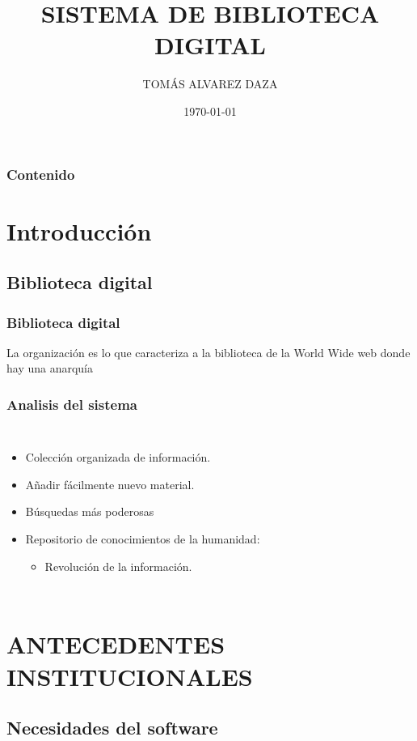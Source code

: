 \documentclass[article]{beamer}
\title{SISTEMA DE BIBLIOTECA DIGITAL}
\author{TOMÁS ALVAREZ DAZA}
\institute{PLANIFICACIÓN DEL DESARROLLO DE SOFTWARE \\ Universidad Bolivana de Informática}
\date{\scriptsize{\today}}
\begin{document}

\maketitle


\begin{frame}
\frametitle{Contenido}
\tableofcontents
\end{frame}
\section{Introducción}
\subsection{Biblioteca digital}
\begin{frame}[fragile]
\frametitle{Biblioteca digital}
La organización es lo que
caracteriza a la biblioteca de la World Wide web donde hay una anarquía
\end{frame}

\begin{frame}[fragile]
\frametitle{Analisis del sistema}
\begin{columns}
 \begin{itemize}
	\item  Colección organizada de información. 
	\item  Añadir  fácilmente nuevo material. 
	\item Búsquedas más poderosas
	\item Repositorio de conocimientos de la humanidad:
\begin{itemize}
\item Revolución de la información.
\end{itemize} 
\end{itemize}
\end{columns}

\end{frame}

\section{ANTECEDENTES INSTITUCIONALES}
\subsection{Necesidades del software}
\end{document}
